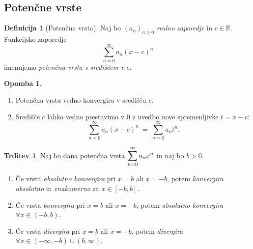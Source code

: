 \documentclass[11pt]{article}
\theoremstyle{definition}
\newtheorem{definicija}{Definicija}[section]
\theoremstyle{definition}
\newtheorem{trditev}{Trditev}[section]
\theoremstyle{definition}
\theoremstyle{theorem}
\newtheorem*{opomba}{Opomba}
\begin{document}

\subsection{Potenčne vrste}
\vspace{0.5cm}

\begin{definicija}[Potenčna vrsta]

Naj bo $(a_n)_{n \geq 0}$ \textit{realno zaporedje} in $c \in \mathbb{R}$. Funkcijsko zaporedje $$\sum_{n=0}^{\infty} a_n (x - c)^n$$
imenujemo \textit{potenčna vrsta s središčem v $c$}.

\end{definicija}
\vspace{0.5cm}

\begin{opomba}
~
\begin{enumerate}
	\item Potenčna vrsta vedno konvergira v središču $c$.
	\item Središče $c$ lahko vedno prestavimo v $0$ z uvedbo nove spremenljivke $t = x - c$:
	$$\sum_{n=0}^{\infty} a_n (x-c)^n ~=~ \sum_{n=0}^{\infty} a_n t^n.$$
\end{enumerate}
\end{opomba}
\vspace{0.5cm}

\begin{trditev}

Naj bo dana potenčna vrsta $\mathlarger{\sum_{n=0}^\infty a_n x^n}$ in naj bo $b > 0$.  
\begin{enumerate}
	\item[(1)] Če vrsta \textit{absolutno konvergira} pri $x = b$ ali $x = -b$, potem \textit{konvergira absolutno} in \textit{enakomerno} za $x \in [-b, b]$.
	\item[(2)] Če vrsta \textit{konvergira} pri $x = b$ ali $x = -b$, potem \textit{absolutno konvergira} $\forall x \in (-b, b)$.
	\item[(3)] Če vrsta \textit{divergira} pri $x = b$ ali $x = -b$, potem \textit{divergira} \\$\forall x \in (-\infty, -b) \cup (b, \infty)$.
\end{enumerate}

\end{trditev}
\vspace{0.5cm}
\end{document}
